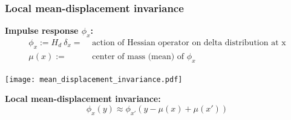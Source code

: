 \documentclass[10pt,final,xcolor=dvipsnames,aspect ratio=169]{beamer}
\begin{document}
\begin{frame}
	\frametitle{Local mean-displacement invariance}
	\begin{center}
		\textbf{Impulse response $\phi_x$:}
		\begin{align*}
		\phi_x := H_d~ \delta_x =& \text{ action of Hessian operator on delta distribution at x} \\
		\mu(x) :=& \text{ center of mass (mean) of }\phi_x
		\end{align*}
		
		\vspace{1em}
		
		\texttt{[image: mean\_displacement\_invariance.pdf]}
		
		\vspace{1em}
		
		\textbf{Local mean-displacement invariance:}
		$$\phi_x(y) \approx \phi_{x'}(y-\mu(x) + \mu(x'))$$
		
	\end{center}
\end{frame}
\end{document}
